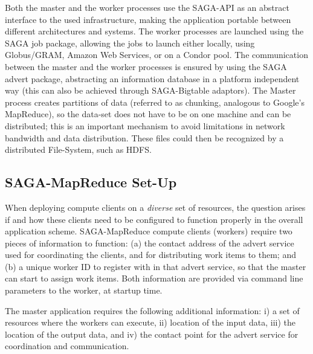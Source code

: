 \documentclass[conference,final]{IEEEtran}
\newcommand{\sagamapreduce }{SAGA-MapReduce }
\newcommand{\I}[1]{\textit{#1}}
\begin{document}
Both the master and the worker processes use the SAGA-API as an
abstract interface to the used infrastructure, making the application
portable between different architectures and systems. The worker
processes are launched using the SAGA job package, allowing the jobs
to launch either locally, using Globus/GRAM, Amazon Web Services, or
on a Condor pool. The communication between the master and the worker
processes is ensured by using the SAGA advert package, abstracting an
information database in a platform independent way (this can also be
achieved through SAGA-Bigtable adaptors).  The Master process creates
partitions of data (referred to as chunking, analogous to Google's
MapReduce), so the data-set does not have to be on one machine and can
be distributed; this is an important mechanism to avoid limitations in
network bandwidth and data distribution.  These files could then be
recognized by a distributed File-System, such as HDFS. %

\subsection{\sagamapreduce Set-Up}
When deploying compute clients on a \I{diverse} set of resources, the
question arises if and how these clients need to be configured to
function properly in the overall application scheme.  \sagamapreduce
compute clients (workers) require two pieces of information to
function: (a) the contact address of the advert service used for
coordinating the clients, and for distributing work items to them; and
(b) a unique worker ID to register with in that advert service, so
that the master can start to assign work items.  Both information are
provided via command line parameters to the worker, at startup time.

The master application requires the following additional information:
i) a set of resources where the workers can execute, ii) location of
the input data, iii) the location of the output data, and iv) the
contact point for the advert service for coordination and
communication.  
\end{document}
